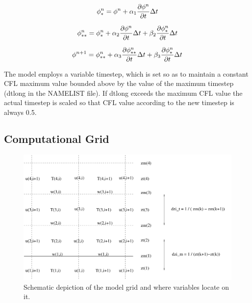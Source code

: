 \documentclass[11pt,a4paper]{article}
\begin{document}
\begin{equation}
	\phi_*^{n} = \phi^{n} + \alpha_1 \frac{\partial \phi^{n}}{\partial t} \Delta t \\
	\label{eq:phi1}
\end{equation}

\begin{equation}
	\phi_{**}^{n} = \phi_*^{n} + \alpha_2 \frac{\partial \phi^{n}}{\partial t} \Delta t + \beta_2 \frac{\partial \phi_*^{n}}{\partial t} \Delta t\\
	\label{eq:phi2}
\end{equation}

\begin{equation}
	\phi^{n+1} = \phi_{**}^{n} + \alpha_3 \frac{\partial \phi_{**}^{n}}{\partial t} \Delta t + \beta_3 \frac{\partial \phi_*^{n}}{\partial t} \Delta t\\
	\label{eq:phi3}
\end{equation}

The model employs a variable timestep, which is set so as to maintain
a constant CFL maximum value bounded above by the value of the maximum
timestep (dtlong in the NAMELIST file). If dtlong exceeds the maximum
CFL value the actual timestep is scaled so that CFL value according
to the new timestep is always 0.5.

\subsection{Computational Grid}
\begin{figure}[htb]
\centering \leavevmode \includegraphics[width=12cm]{grid2}
\caption{Schematic depiction of the model grid and where variables
locate on it.}
\label{fig:grid}
\end{figure}
\end{document}
